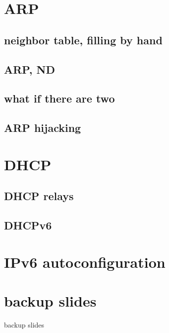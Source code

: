 \section{ARP}

\subsection{neighbor table, filling by hand}


\subsection{ARP, ND}



\subsection{what if there are two}



\subsection{ARP hijacking}




\section{DHCP}


\subsection{DHCP relays}


\subsection{DHCPv6}


\section{IPv6 autoconfiguration}




\section{backup slides}
\begin{frame}{backup slides}
\end{frame}


